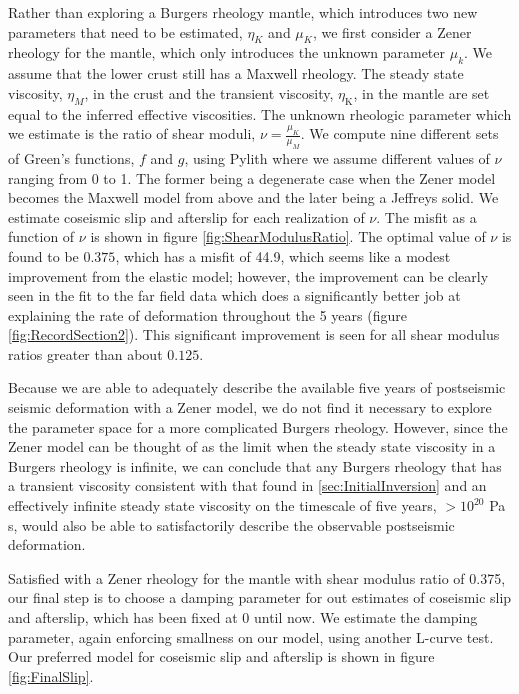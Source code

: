 \documentclass[1p]{elsarticle}
\begin{document}
Rather than exploring a Burgers rheology mantle, which introduces two new parameters that need to be estimated, $\eta_{K}$ and $\mu_{K}$, we first consider a Zener rheology for the mantle, which only introduces the unknown parameter $\mu_{k}$.  We assume that the lower crust still has a Maxwell rheology. The steady state viscosity, $\eta_{M}$, in the crust and the transient viscosity, $\eta_\mathrm{K}$, in the mantle are set equal to the inferred effective viscosities. The unknown rheologic parameter which we estimate is the ratio of shear moduli, $\nu=\frac{\mu_K}{\mu_M}$. We compute nine different sets of Green's functions, $f$ and $g$, using Pylith where we assume different values of $\nu$ ranging from 0 to 1. The former being a degenerate case when the Zener model becomes the Maxwell model from above and the later being a Jeffreys solid.  We estimate coseismic slip and afterslip for each realization of $\nu$.  The misfit as a function of $\nu$ is shown in figure \ref{fig:ShearModulusRatio}.  The optimal value of $\nu$ is found to be $0.375$, which has a misfit of 44.9,  which seems like a modest improvement from the elastic model; however, the improvement can be clearly seen in the fit to the far field data which does a significantly better job at explaining the rate of deformation throughout the 5 years (figure \ref{fig:RecordSection2}).  This significant improvement is seen for all shear modulus ratios greater than about $0.125$. 

Because we are able to adequately  describe the available five years of postseismic seismic deformation with a Zener model, we do not find it necessary to explore the parameter space for a more complicated Burgers rheology.  However, since the Zener model can be thought of as the limit when the steady state viscosity in a Burgers rheology is infinite, we can conclude that any Burgers rheology that has a transient viscosity consistent with that found in \ref{sec:InitialInversion} and an effectively infinite steady state viscosity on the timescale of five years, $>10^{20}$ Pa s, would also be able to satisfactorily describe the observable postseismic deformation.        

Satisfied with a Zener rheology for the mantle with shear modulus ratio of 0.375, our final step is to choose a damping parameter for out estimates of coseismic slip and afterslip, which has been fixed at 0 until now.  We estimate the damping parameter, again enforcing smallness on our model, using another L-curve test.  Our preferred model for coseismic slip and afterslip is shown in figure \ref{fig:FinalSlip}.  
\end{document}
